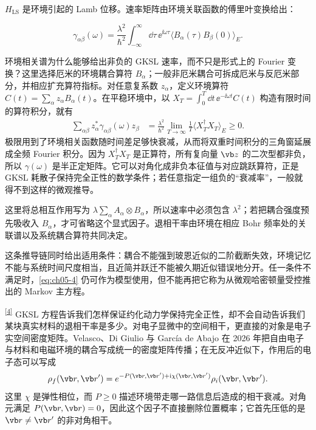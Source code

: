 $H_{\mathrm{LS}}$ 是环境引起的 Lamb 位移。速率矩阵由环境关联函数的傅里叶变换给出：

\begin{equation*}
\gamma_{\alpha\beta}(\omega)=\frac{\lambda^2}{\hbar^2}\int_{-\infty}^{\infty}\dd \tau\,\ee^{\ii\omega\tau}\langle B_\alpha(\tau)B_\beta(0)\rangle_E.
\end{equation*}

环境相关谱为什么能够给出非负的 GKSL 速率，而不只是形式上的 Fourier 变换？这里选择厄米的环境耦合算符 $B_\alpha$；一般非厄米耦合可拆成厄米与反厄米部分，并相应扩充算符指标。对任意复系数 $z_\alpha$，定义环境算符 $C(t)=\sum_\alpha z_\alpha B_\alpha(t)$。在平稳环境中，以 $X_T=\int_0^T\dd t\,\ee^{-\ii\omega t}C(t)$ 构造有限时间的算符积分，就有
\begin{align*}
\sum_{\alpha\beta}z_\alpha^*\gamma_{\alpha\beta}(\omega)z_\beta
&=\frac{\lambda^2}{\hbar^2}\lim_{T\to\infty}\frac1T
\langle X_T^\dagger X_T\rangle_E\ge0.
\end{align*}
极限用到了环境相关函数随时间差足够快衰减，从而将双重时间积分的三角窗延展成全频 Fourier 积分。因为 $X_T^\dagger X_T$ 是正算符，所有复向量 $\vb z$ 的二次型都非负，所以 $\gamma(\omega)$ 是半正定矩阵。它可以对角化成非负本征值与对应跳跃算符，正是 GKSL 耗散子保持完全正性的数学条件；若任意指定一组负的“衰减率”，一般就得不到这样的微观推导。

这里将总相互作用写为 $\lambda\sum_\alpha A_\alpha\otimes B_\alpha$，所以速率中必须包含 $\lambda^2$；若把耦合强度预先吸收入 $B_\alpha$，才可省略这个显式因子。退相干率由环境在相应 Bohr 频率处的关联谱以及系统耦合算符共同决定。

这条推导链同时给出适用条件：耦合不能强到玻恩近似的二阶截断失效，环境记忆不能与系统时间尺度相当，且近简并跃迁不能被久期近似错误地分开。任一条件不满足时，\cref{eq:ch05-4} 仍可作为模型使用，但不能再把它称为从微观哈密顿量受控推出的 Markov 主方程。

\textsuperscript{\hyperref[ch05-ref4]{[4]}}
GKSL 方程告诉我们怎样保证约化动力学保持完全正性，却不会自动告诉我们某块真实材料的退相干率是多少。对电子显微中的空间相干，更直接的对象是电子实空间密度矩阵。Velasco、Di Giulio 与 García de Abajo 在 2026 年把自由电子与材料和电磁环境的耦合写成统一的密度矩阵传播；在无反冲近似下，作用后的电子态可以写成
\begin{equation}
\rho_f(\vb r,\vb r')
=e^{-P(\vb r,\vb r')+\ii\chi(\vb r,\vb r')}
\rho_i(\vb r,\vb r').
\label{eq:ch05-material-decoherence}
\end{equation}
这里 $\chi$ 是弹性相位，而 $P\ge0$ 描述环境带走哪一路信息后造成的相干衰减。对角元满足 $P(\vb r,\vb r)=0$，因此这个因子不直接删除位置概率；它首先压低的是 $\vb r\neq\vb r'$ 的非对角相干。


